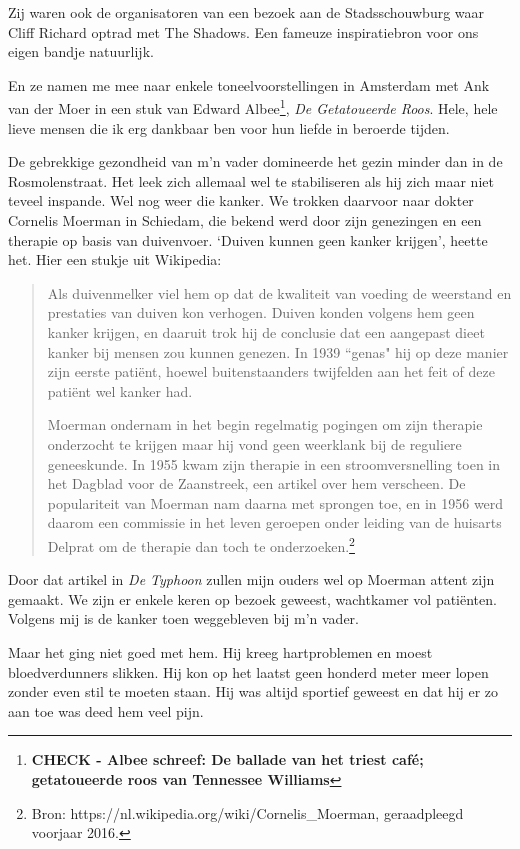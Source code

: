 \documentclass[12pt,twoside, openright]{memoir}
\begin{document}
Zij waren ook de organisatoren van een bezoek aan de Stadsschouwburg waar Cliff Richard optrad met The Shadows. Een fameuze inspiratiebron voor ons eigen bandje natuurlijk. 

En ze namen me mee naar enkele toneelvoorstellingen in Amsterdam met Ank van der Moer in een stuk van Edward Albee\footnote{\bf{CHECK} - Albee schreef: De ballade van het triest café; getatoueerde roos van Tennessee Williams}, \emph{De Getatoueerde Roos}. Hele, hele lieve mensen die ik erg dankbaar ben voor hun liefde in beroerde tijden. 

De gebrekkige gezondheid van m’n vader domineerde het gezin minder dan in de Rosmolenstraat. Het leek zich allemaal wel te stabiliseren als hij zich maar niet teveel inspande. Wel nog weer die kanker. We trokken daarvoor naar dokter Cornelis Moerman in Schiedam, die bekend werd door zijn genezingen en een therapie op basis van duivenvoer. `Duiven kunnen geen kanker krijgen', heette het. Hier een stukje uit Wikipedia:

\begin{quote}
Als duivenmelker viel hem op dat de kwaliteit van voeding de weerstand en prestaties van duiven kon verhogen. Duiven konden volgens hem geen kanker krijgen, en daaruit trok hij de conclusie dat een aangepast dieet kanker bij mensen zou kunnen genezen. In 1939 ``genas" hij op deze manier zijn eerste patiënt, hoewel buitenstaanders twijfelden aan het feit of deze patiënt wel kanker had. 

Moerman ondernam in het begin regelmatig pogingen om zijn therapie onderzocht te krijgen maar hij vond geen weerklank bij de reguliere geneeskunde. In 1955 kwam zijn therapie in een stroomversnelling toen in het Dagblad voor de Zaanstreek,  een artikel over hem verscheen. De populariteit van Moerman nam daarna met sprongen toe, en in 1956 werd daarom een commissie in het leven geroepen onder leiding van de huisarts Delprat om de therapie dan toch te onderzoeken.\footnote{Bron: https://nl.wikipedia.org/wiki/Cornelis_Moerman, geraadpleegd voorjaar 2016.}
\end{quote}

Door dat artikel in \emph{De Typhoon} zullen mijn ouders wel op Moerman attent zijn gemaakt. We zijn er enkele keren op bezoek geweest, wachtkamer vol patiënten. Volgens mij is de kanker toen weggebleven bij m’n vader. 

Maar het ging niet goed met hem. Hij kreeg hartproblemen en moest bloedverdunners slikken. Hij kon op het laatst geen honderd meter meer lopen zonder even stil te moeten staan. Hij was altijd sportief geweest en dat hij er zo aan toe was deed hem veel pijn.
\end{document}

